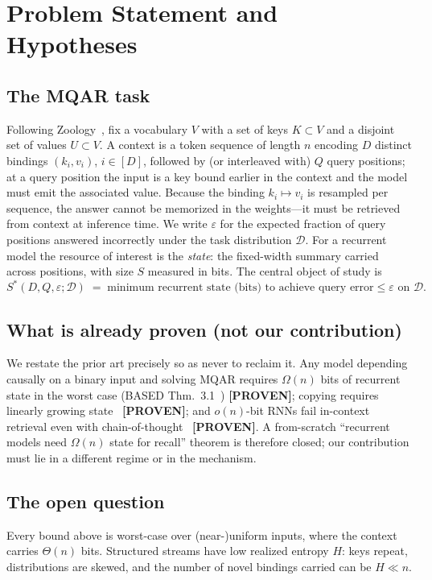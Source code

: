 \section{Problem Statement and Hypotheses}
\label{sec:problem}

\subsection{The MQAR task}
Following Zoology~\citep{arora2024zoology}, fix a vocabulary $V$ with a set of keys
$K \subset V$ and a disjoint set of values $U \subset V$. A context is a token sequence of
length $n$ encoding $D$ distinct bindings $(k_i, v_i)$, $i \in [D]$, followed by (or interleaved
with) $Q$ query positions; at a query position the input is a key bound earlier in the context
and the model must emit the associated value. Because the binding $k_i \mapsto v_i$ is resampled
per sequence, the answer cannot be memorized in the weights---it must be retrieved from context
at inference time. We write $\varepsilon$ for the expected fraction of query positions answered
incorrectly under the task distribution $\mathcal{D}$. For a recurrent model the resource of
interest is the \emph{state}: the fixed-width summary carried across positions, with size $S$
measured in bits. The central object of study is
\begin{equation}
  S^*(D, Q, \varepsilon; \mathcal{D}) \;=\; \text{minimum recurrent state (bits) to achieve query error} \le \varepsilon \text{ on } \mathcal{D}.
\end{equation}

\subsection{What is already proven (not our contribution)}
We restate the prior art precisely so as never to reclaim it. Any model depending causally on a
binary input and solving MQAR requires $\Omega(n)$ bits of recurrent state in the worst case
(BASED Thm.~3.1~\citep{arora2024based}) \textbf{[PROVEN]}; copying requires linearly growing
state~\citep{jelassi2024copying} \textbf{[PROVEN]}; and $o(n)$-bit RNNs fail in-context
retrieval even with chain-of-thought~\citep{wen2025rnns} \textbf{[PROVEN]}. A from-scratch
``recurrent models need $\Omega(n)$ state for recall'' theorem is therefore closed; our
contribution must lie in a different regime or in the mechanism.

\subsection{The open question}
Every bound above is worst-case over (near-)uniform inputs, where the context carries
$\Theta(n)$ bits. Structured streams have low realized entropy $H$: keys repeat, distributions
are skewed, and the number of novel bindings carried can be $H \ll n$.

